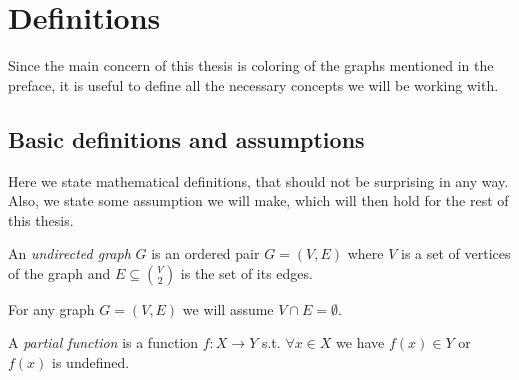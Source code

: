 \chapter{Definitions}

Since the main concern of this thesis is coloring of the graphs mentioned in the preface, it is useful to define all the necessary concepts we will be working with.

\section{Basic definitions and assumptions}

Here we state mathematical definitions, that should not be surprising in any way. Also, we state some assumption we will make, which will then hold for the rest of this thesis.

\begin{definition}
    An \textit{undirected graph} $G$ is an ordered pair $G=(V,E)$ where $V$ is a set of vertices of the graph and $E \subseteq \binom{V}{2}$ is the set of its edges. 
\end{definition}

\begin{assumption}
    For any graph $G=(V,E)$ we will assume $V \cap E = \emptyset$. 
\end{assumption}

\begin{definition}
    A \textit{partial function} is a function $f:X \rightarrow Y$ s.t. $\forall x \in X$ we have $f(x) \in Y$ or $f(x)$ is undefined.
\end{definition}

